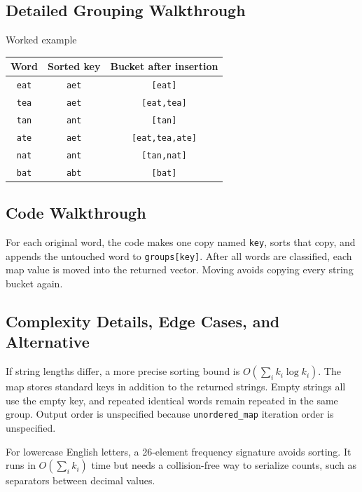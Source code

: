 \subsection{Detailed Grouping Walkthrough}
\begin{dryrunbox}{Worked example}
\begin{center}
\begin{tabular}{@{}c c c@{}}
\toprule
Word & Sorted key & Bucket after insertion \\
\midrule
\texttt{eat} & \texttt{aet} & \texttt{[eat]} \\
\texttt{tea} & \texttt{aet} & \texttt{[eat,tea]} \\
\texttt{tan} & \texttt{ant} & \texttt{[tan]} \\
\texttt{ate} & \texttt{aet} & \texttt{[eat,tea,ate]} \\
\texttt{nat} & \texttt{ant} & \texttt{[tan,nat]} \\
\texttt{bat} & \texttt{abt} & \texttt{[bat]} \\
\bottomrule
\end{tabular}
\end{center}
\end{dryrunbox}

\subsection{Code Walkthrough}
For each original word, the code makes one copy named \texttt{key}, sorts that
copy, and appends the untouched word to \texttt{groups[key]}. After all words
are classified, each map value is moved into the returned vector. Moving
avoids copying every string bucket again.

\subsection{Complexity Details, Edge Cases, and Alternative}
If string lengths differ, a more precise sorting bound is
\(O(\sum_i k_i\log k_i)\). The map stores standard keys in addition to the
returned strings. Empty strings all use the empty key, and repeated identical
words remain repeated in the same group. Output order is unspecified because
\texttt{unordered\_map} iteration order is unspecified.

For lowercase English letters, a 26-element frequency signature avoids
sorting. It runs in \(O(\sum_i k_i)\) time but needs a collision-free way to
serialize counts, such as separators between decimal values.

